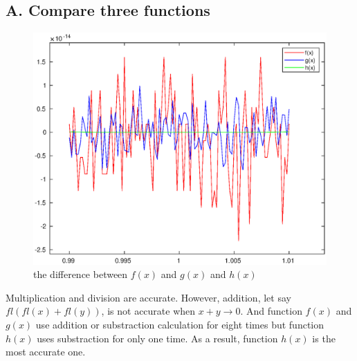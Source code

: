 \documentclass[twoside,a4paper]{article}
\begin{document}
\subsection*{A. Compare three functions}
\begin{figure}[h]
\includegraphics[width=7in]{Figure/comparison.eps}
\caption{the difference between $f(x)$ and $g(x)$ and $h(x)$}
\end{figure}
Multiplication and division are accurate. However, addition, let say $fl(fl(x)+fl(y))$, is not accurate when $x+y\to0$. And function $f(x)$ and $g(x)$ use addition or substraction calculation for eight times but function $h(x)$ uses substraction for only one time. As a result, function $h(x)$ is the most accurate one.
\end{document}
